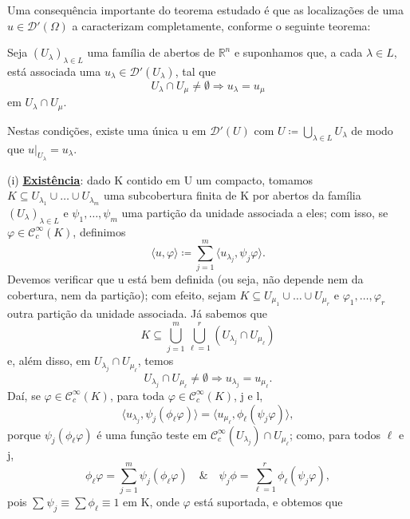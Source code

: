 \documentclass[../distribution_theory_notes.tex]{subfiles}
\begin{document}
Uma consequência importante do teorema estudado é que as localizações de uma \(u\in \mathcal{D}'(\Omega )\) a caracterizam completamente, conforme o seguinte teorema:
\begin{theorem*}
	Seja \((U_{\lambda })_{\lambda \in L}\) uma família de abertos de \(\mathbb{R}^{n}\) e suponhamos que, a cada \(\lambda \in L\), está associada uma \(u_{\lambda }\in \mathcal{D}'(U_{\lambda })\), tal que
	\[
		U_{\lambda }\cap U_{\mu }\neq \emptyset \Rightarrow u_{\lambda } = u_{\mu }
	\]
	em \(U_{\lambda} \cap U_{\mu }\).

	Nestas condições, existe uma única u em \(\mathcal{D}'(U)\) com \(U\coloneqq \bigcup_{\lambda \in L}^{}U_{\lambda }\) de modo que \(u|_{U_{\lambda }}=u_{\lambda }.\)
\end{theorem*}
\begin{proof*}
	(i) \textbf{\underline{Existência}}: dado K contido em U um compacto, tomamos \(K\subseteq U_{\lambda_1}\cup \dotsc \cup U_{\lambda_{m}} \) uma subcobertura finita de K por abertos da família \((U_{\lambda })_{\lambda \in L}\) e \(\psi_1, \dotsc , \psi_{m}\) uma partição da unidade associada a eles; com isso, se \(\varphi \in \mathcal{C}_{c}^{\infty}(K)\), definimos
	\[
		\langle u, \varphi  \rangle \coloneqq \sum\limits_{j=1}^{m}\langle u_{\lambda_{j}}, \psi_{j}\varphi  \rangle.
	\]
	Devemos verificar que u está bem definida (ou seja, não depende nem da cobertura, nem da partição); com efeito, sejam \(K\subseteq U_{\mu_1} \cup \dotsc \cup U_{\mu_r}\) e \(\varphi_1, \dotsc , \varphi_{r}\) outra partição da unidade associada. Já sabemos que
	\[
		K\subseteq \bigcup_{j=1}^{m}\bigcup_{\ell =1}^{r}(U_{\lambda_{j}}\cap U_{\mu_{\ell }})
	\]
	e, além disso, em \(U_{\lambda_{j}}\cap U_{\mu_{\ell }}\), temos
	\[
		U_{\lambda_{j}}\cap U_{\mu_{\ell }}\neq\emptyset \Rightarrow u_{\lambda_{j}}=u_{\mu_{\ell }}.
	\]
	Daí, se \(\varphi \in \mathcal{C}_{c}^{\infty}(K)\), para toda \(\varphi \in \mathcal{C}_{c}^{\infty}(K)\), j e l,
	\[
		\langle u_{\lambda_{j}}, \psi_{j}(\phi_{\ell }\varphi ) \rangle=\langle u_{\mu_{\ell}}, \phi_{\ell}(\psi_{j}\varphi ) \rangle,
	\]
	porque \(\psi_{j}(\phi_{\ell}\varphi )\) é uma função teste  em \(\mathcal{C}_{c}^{\infty}(U_{\lambda_{j}})\cap U_{\mu_{\ell}}\); como, para todos \(\ell \) e j,
	\[
		\phi_{\ell}\varphi =\sum\limits_{j=1}^{m}\psi_{j}(\phi_{\ell}\varphi ) \quad\&\quad \psi_{j}\phi = \sum\limits_{\ell =1}^{r}\phi_{\ell }(\psi_{j}\varphi ),
	\]
	pois \(\sum\limits_{}^{}\psi_{j}\equiv \sum \phi_{\ell}\equiv 1\) em K, onde \(\varphi \) está suportada, e obtemos que
	\begin{align*}

\end{align*}
\end{proof*}
\end{document}
